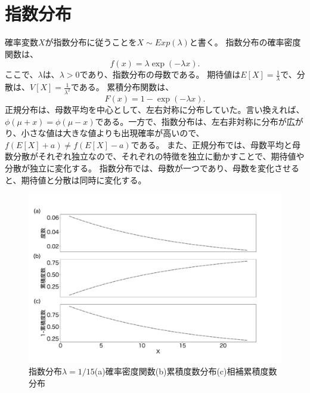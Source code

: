 \section{指数分布}
確率変数$X$が指数分布に従うことを$X \sim Exp(\lambda)$と書く。
指数分布の確率密度関数は、
\begin{equation*}
    f(x)=\lambda \exp(-\lambda x).
\end{equation*}
ここで、$\lambda$は、$\lambda>0$であり、指数分布の母数である。
期待値は$E[X]=\frac{1}{\lambda}$で、分散は、$V[X]=\frac{1}{\lambda^2}$である。
累積分布関数は、
\begin{equation*}
    F(x)=1-\exp(-\lambda x).
\end{equation*}
正規分布は、母数平均を中心として、左右対称に分布していた。言い換えれば、$\phi(\mu+x)=\phi(\mu-x)$である。一方で、指数分布は、左右非対称に分布が広がり、小さな値は大きな値よりも出現確率が高いので、$f(E[X]+a)\neq f(E[X]-a)$である。
また、正規分布では、母数平均と母数分散がそれぞれ独立なので、それぞれの特徴を独立に動かすことで、期待値や分散が独立に変化する。
指数分布では、母数が一つであり、母数を変化させると、期待値と分散は同時に変化する。



\begin{figure}
    \begin{center}
        \includegraphics[width=15cm]{./image/02_/expon_frequency.pdf}
        \caption{指数分布$\lambda=1/15$(a)確率密度関数(b)累積度数分布(c)相補累積度数分布}
        \label{expon_frequency}
    \end{center}
\end{figure}


